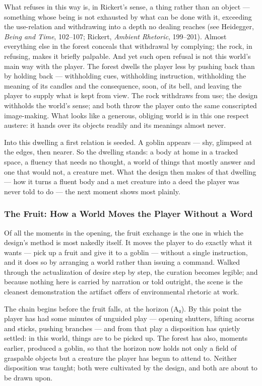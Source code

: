 \documentclass{article}
\begin{document}
What refuses in this way is, in Rickert's sense, a thing rather than an object — something whose being is not exhausted by what can be done with it, exceeding the use-relation and withdrawing into a depth no dealing reaches (see Heidegger, \textit{Being and Time}, 102–107; Rickert, \textit{Ambient Rhetoric}, 199–201). Almost everything else in the forest conceals that withdrawal by complying; the rock, in refusing, makes it briefly palpable. And yet such open refusal is not this world's main way with the player. The forest dwells the player less by pushing back than by holding back — withholding cues, withholding instruction, withholding the meaning of its candles and the consequence, soon, of its bell, and leaving the player to supply what is kept from view. The rock withdraws from use; the design withholds the world's sense; and both throw the player onto the same conscripted image-making. What looks like a generous, obliging world is in this one respect austere: it hands over its objects readily and its meanings almost never.

Into this dwelling a first relation is seeded. A goblin appears — shy, glimpsed at the edges, then nearer. So the dwelling stands: a body at home in a tracked space, a fluency that needs no thought, a world of things that mostly answer and one that would not, a creature met. What the design then makes of that dwelling — how it turns a fluent body and a met creature into a deed the player was never told to do — the next moment shows most plainly.

\subsubsection*{The Fruit: How a World Moves the Player Without a Word}

Of all the moments in the opening, the fruit exchange is the one in which the design's method is most nakedly itself. It moves the player to do exactly what it wants — pick up a fruit and give it to a goblin — without a single instruction, and it does so by arranging a world rather than issuing a command. Walked through the actualization of desire step by step, the curation becomes legible; and because nothing here is carried by narration or told outright, the scene is the cleanest demonstration the artifact offers of environmental rhetoric at work.

The chain begins before the fruit falls, at the horizon (A₀). By this point the player has had some minutes of unguided play — opening shutters, lifting acorns and sticks, pushing branches — and from that play a disposition has quietly settled: in this world, things are to be picked up. The forest has also, moments earlier, produced a goblin, so that the horizon now holds not only a field of graspable objects but a creature the player has begun to attend to. Neither disposition was taught; both were cultivated by the design, and both are about to be drawn upon.
\end{document}
